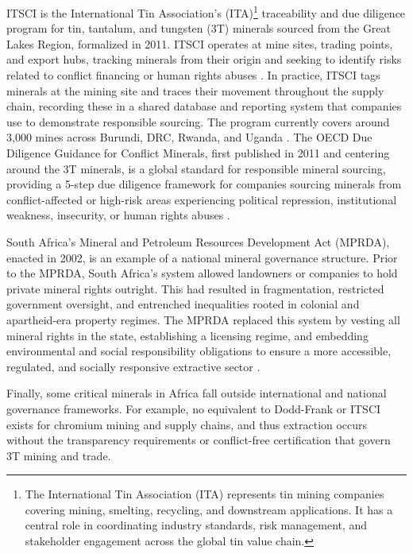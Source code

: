 \documentclass[11pt]{article}
\begin{document}
ITSCI is the International Tin Association's (ITA)\footnote{The International Tin Association (ITA) represents tin mining companies covering mining, smelting, recycling, and downstream applications. It has a central role in coordinating industry standards, risk management, and stakeholder engagement across the global tin value chain.} traceability and due diligence program for tin, tantalum, and tungsten (3T) minerals sourced from the Great Lakes Region, formalized in 2011. ITSCI operates at mine sites, trading points, and export hubs, tracking minerals from their origin and seeking to identify risks related to conflict financing or human rights abuses \citep{postma2021itsci}. In practice, ITSCI tags minerals at the mining site and traces their movement throughout the supply chain, recording these in a shared database and reporting system that companies use to demonstrate responsible sourcing. The program currently covers around 3,000 mines across Burundi, DRC, Rwanda, and Uganda \citep{itsci2026}. The OECD Due Diligence Guidance for Conflict Minerals, first published in 2011 and centering around the 3T minerals, is a global standard for responsible mineral sourcing, providing a 5-step due diligence framework for companies sourcing minerals from conflict-affected or high-risk areas experiencing political repression, institutional weakness, insecurity, or human rights abuses \citep{cardona2024due}.

South Africa's Mineral and Petroleum Resources Development Act (MPRDA), enacted in 2002, is an example of a national mineral governance structure. Prior to the MPRDA, South Africa's system allowed landowners or companies to hold private mineral rights outright. This had resulted in fragmentation, restricted government oversight, and entrenched inequalities rooted in colonial and apartheid-era property regimes. The MPRDA replaced this system by vesting all mineral rights in the state, establishing a licensing regime, and embedding environmental and social responsibility obligations to ensure a more accessible, regulated, and socially responsive extractive sector \citep{cawood2004mineral, cawood2004investment}.

Finally, some critical minerals in Africa fall outside international and national governance frameworks. For example, no equivalent to Dodd-Frank or ITSCI exists for chromium mining and supply chains, and thus extraction occurs without the transparency requirements or conflict-free certification that govern 3T mining and trade. 
\end{document}

